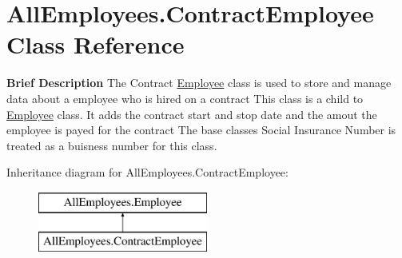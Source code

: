 \hypertarget{class_all_employees_1_1_contract_employee}{}\section{All\+Employees.\+Contract\+Employee Class Reference}
\label{class_all_employees_1_1_contract_employee}


{\bfseries Brief Description} The Contract \hyperlink{class_all_employees_1_1_employee}{Employee} class is used to store and manage data about a employee who is hired on a contract This class is a child to \hyperlink{class_all_employees_1_1_employee}{Employee} class. It adds the contract start and stop date and the amout the employee is payed for the contract The base classes Social Insurance Number is treated as a buisness number for this class.  


Inheritance diagram for All\+Employees.\+Contract\+Employee\+:\begin{figure}[H]
\begin{center}
\leavevmode
\includegraphics[height=2.000000cm]{class_all_employees_1_1_contract_employee}
\end{center}
\end{figure}

